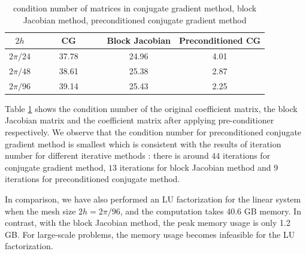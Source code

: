 \begin{table}[htbp]
	\begin{center}
		\begin{tabular}{|c|c c c|}
			\hline
			$2h$   & ~~~~ CG ~~~~& Block Jacobian & Preconditioned CG  \\
			\hline
			$2\pi/24$ &37.78& 24.96& 4.01\\
			\hline
			$2\pi/48$ &38.61 & 25.38 & 2.87\\
			\hline 
			$2\pi/96$ &39.14 &25.43 & 2.25\\
			\hline
		\end{tabular}
	\end{center}
	\caption{condition number of matrices in conjugate gradient method, block Jacobian method, preconditioned conjugate gradient method}\label{condition_number}
\end{table} 
Table \ref{condition_number} shows the condition number of the original coefficient matrix, the block Jacobian matrix and the coefficient matrix after applying pre-conditioner respectively. We observe that the condition number for preconditioned conjugate gradient method is smallest which is consistent with the results of iteration number for different iterative methods : there is around $44$ iterations for conjugate gradient method, $13$ iterations for block Jacobian method and $9$ iterations for preconditioned conjugate method.

In comparison, we have also performed an LU factorization for the linear system when the mesh size $2h = 2\pi/96$, and the computation takes 40.6 GB memory. In contrast, with the block Jacobian method, the peak memory usage is only 1.2 GB. For large-scale problems, the memory usage becomes infeasible for the LU factorization. 

